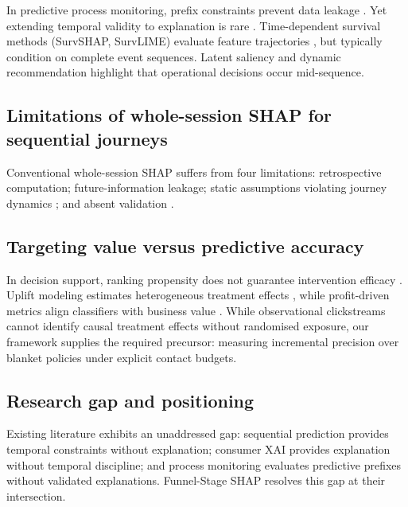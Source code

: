 \documentclass[a4paper]{article}
\begin{document}
In predictive process monitoring, prefix constraints prevent data leakage
\citep{verenich2019survey, cao2022transition, chen2022multi, oberdorf2022predictive}.
Yet extending temporal validity to explanation is rare
\citep{wickramanayake2023generating, mehdiyev2024quantifying}. Time-dependent
survival methods (SurvSHAP, SurvLIME) evaluate feature trajectories
\citep{krzyzinski2022survshap, kovalev2020survlime}, but typically condition on
complete event sequences. Latent saliency \citep{schroder2023latent} and dynamic
recommendation \citep{wu2023faster} highlight that operational decisions occur
mid-sequence.

\subsection{Limitations of whole-session SHAP for sequential journeys}
\label{sec:related-limitations}

Conventional whole-session SHAP suffers from four limitations: retrospective
computation; future-information leakage; static assumptions violating journey
dynamics \citep{bucklin2003model, sismeiro2004modeling, montgomery2004modeling};
and absent validation \citep{saarela2024recent, mainali2023meant, nauta2023anecdotal,
adadi2018peeking}.

\subsection{Targeting value versus predictive accuracy}
\label{sec:related-uplift}

In decision support, ranking propensity does not guarantee intervention efficacy
\citep{ascarza2018retention}. Uplift modeling estimates heterogeneous treatment
effects \citep{devriendt2018literature}, while profit-driven metrics align
classifiers with business value \citep{verbraken2013novel, lemmens2020managing,
gubela2021uplift}. While observational clickstreams cannot identify causal treatment
effects without randomised exposure, our framework supplies the required precursor:
measuring incremental precision over blanket policies under explicit contact budgets.

\subsection{Research gap and positioning}
\label{sec:related-gap}

Existing literature exhibits an unaddressed gap: sequential prediction provides
temporal constraints without explanation; consumer XAI provides explanation without
temporal discipline; and process monitoring evaluates predictive prefixes without
validated explanations. Funnel-Stage SHAP resolves this gap at their intersection.
\end{document}
